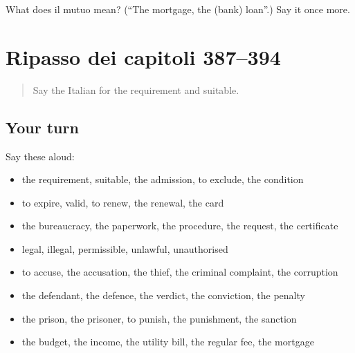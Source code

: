 \begin{tcolorbox}[breakable,colback=teal!4,colframe=teal!35!black,title={Before you move on}]
What does il mutuo mean? (\textquotedblleft{}The mortgage, the (bank) loan\textquotedblright{}.) Say it once more.
\end{tcolorbox}
\section[(dialogue)]{Ripasso dei capitoli 387–394}

\label{lesson:IT-R394-ripasso-387-394}



\begin{quote}
Say the Italian for the requirement and suitable.
\end{quote}

\subsection*{Your turn}
Say these aloud:

\begin{itemize}
\raggedright
  \item the requirement, suitable, the admission, to exclude, the condition
  \item to expire, valid, to renew, the renewal, the card
  \item the bureaucracy, the paperwork, the procedure, the request, the certificate
  \item legal, illegal, permissible, unlawful, unauthorised
  \item to accuse, the accusation, the thief, the criminal complaint, the corruption
  \item the defendant, the defence, the verdict, the conviction, the penalty
  \item the prison, the prisoner, to punish, the punishment, the sanction
  \item the budget, the income, the utility bill, the regular fee, the mortgage
\end{itemize}

